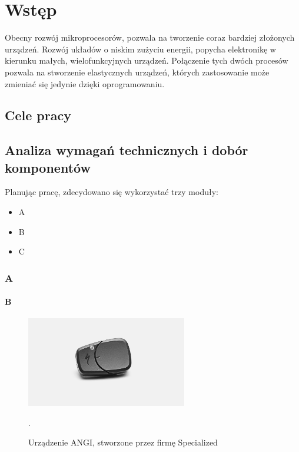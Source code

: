 \chapter{Wstęp}
\label{cha:wstep}

Obecny rozwój mikroprocesorów, pozwala na tworzenie coraz bardziej złożonych urządzeń. Rozwój układów o niskim zużyciu energii, popycha elektronikę w kierunku małych, wielofunkcyjnych urządzeń. Połączenie tych dwóch procesów pozwala na stworzenie elastycznych urządzeń, których zastosowanie może zmieniać się jedynie dzięki oprogramowaniu.


\section{Cele pracy}
\section{Analiza wymagań technicznych i dobór komponentów}
\label{sec:technical_analysis}

Planując pracę, zdecydowano się wykorzystać trzy moduły:
\begin{itemize}
    \item A
    \item B
    \item C
\end{itemize}
\subsection{A}
\subsubsection{B}

\begin{figure}[h]
\includegraphics[width=7cm]{Graphics/angi.png}
\centering
\caption{Urządzenie ANGI, stworzone przez firmę Specialized \cite{ANGI}}.
\centering
\label{img:angi_img}
\end{figure}















